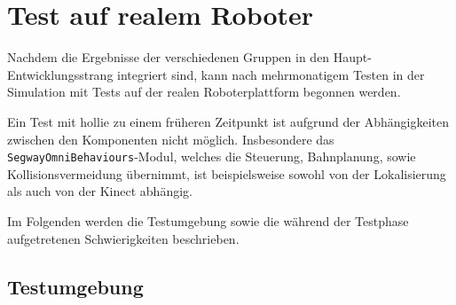 
\chapter{Test auf realem Roboter}
\authorsection{\editortobias}



Nachdem die Ergebnisse der verschiedenen Gruppen in den Haupt-Entwicklungsstrang integriert sind, kann nach mehrmonatigem Testen in der Simulation mit Tests auf der realen Roboterplattform begonnen werden.

Ein Test mit \gls{hollie} zu einem früheren Zeitpunkt ist aufgrund der Abhängigkeiten zwischen den Komponenten nicht möglich.
Insbesondere das \lstinline{SegwayOmniBehaviours}-Modul, welches die Steuerung, Bahnplanung, sowie Kollisionsvermeidung übernimmt, ist beispielsweise sowohl von der Lokalisierung als auch von der Kinect abhängig.

Im Folgenden werden die Testumgebung sowie die während der Testphase aufgetretenen Schwierigkeiten beschrieben.


\section{Testumgebung}
\authorsection{\editortobias}


